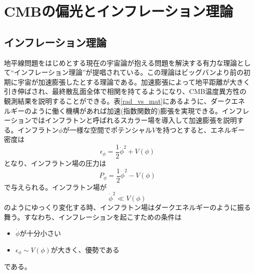 \section{CMBの偏光とインフレーション理論}

\subsection{インフレーション理論}
地平線問題をはじめとする現在の宇宙論が抱える問題を解決する有力な理論として``インフレーション理論''が提唱されている。この理論はビッグバンより前の初期に宇宙が加速膨張したとする理論である。加速膨張によって地平距離が大きく引き伸ばされ、最終散乱面全体で相関を持てるようになり、CMB温度異方性の観測結果を説明することができる。表\ref{rad_vs_mat}にあるように、ダークエネルギーのように働く機構があれば加速(指数関数的)膨張を実現できる。インフレーションではインフラトンと呼ばれるスカラー場を導入して加速膨張を説明する。インフラトン$\phi$が一様な空間でポテンシャル$V$を持つとすると、エネルギー密度は
\begin{equation}
  \epsilon_{\phi} = \frac{1}{2}\dot\phi^{2} + V(\phi) \label{eq:energy_phi}
\end{equation}
となり、インフラトン場の圧力は
\begin{equation}
  P_{\phi} = \frac{1}{2}\dot\phi^{2} - V(\phi) \label{eq:pressure_phi}
\end{equation}
で与えられる。インフラトン場が
\begin{equation}
  \dot\phi^{2} \ll V(\phi) \label{eq:condition}
\end{equation}
のようにゆっくり変化する時、インフラトン場はダークエネルギーのように振る舞う。すなわち、インフレーションを起こすための条件は
\begin{itemize}
  \item $\dot\phi$が十分小さい
  \item $\epsilon_{\phi}\sim V(\phi)$が大きく、優勢である
\end{itemize}
である。

